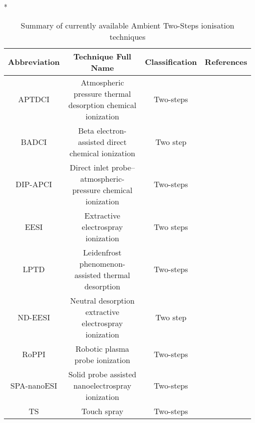 \begin{table}{*}
\caption{Summary of currently available Ambient Two-Steps ionisation techniques}
\label{table:Ambient_TwoSteps}

\centering 
\scriptsize

    \begin{tabular}{|c|c|c|l|}
        \hline
        \textbf{Abbreviation}  & \textbf{Technique Full Name} & \textbf{Classification} & \textbf{References} \\ 
        \hline \hline 
        APTDCI & Atmospheric pressure thermal desorption chemical ionization & Two-steps & \cite{21683155} \\
        BADCI & Beta electron-assisted direct chemical ionization & Two step &  \cite{19641814} \\
        DIP-APCI & Direct inlet probe–atmospheric-pressure chemical ionization & Two-steps & \cite{23912829} \\
        EESI & Extractive electrospray ionization & Two steps & \cite{16767269} \\
        LPTD & Leidenfrost phenomenon-assisted thermal desorption & Two-steps & \cite{23423791} \\
        ND-EESI &  Neutral desorption extractive electrospray ionization & Two step & \cite{17721903} \\
        RoPPI & Robotic plasma probe ionization & Two-steps & \cite{24603806} \\
        SPA-nanoESI & Solid probe assisted nanoelectrospray ionization & Two-steps & \cite{22937532} \\
        TS & Touch spray & Two-steps & \cite{24756256} \\
        \hline \hline 
    \end{tabular}
\end{table}
